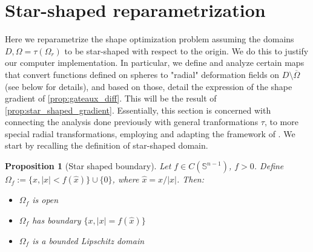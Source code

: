\documentclass[english,a4paper,9pt,oneside]{scrbook}	%
\theoremstyle{break}
\newtheorem{prop}[equation]{Proposition}
\theoremstyle{remark}
\newtheorem{obs}[equation]{Observation}
\newcommand{\mS}{\mathbb{S}^{n-1}}
\newcommand{\xh}{\hat{x}}
\begin{document}

\section{Star-shaped reparametrization}
\label{sec:star}

Here we reparametrize the shape optimization problem assuming the domains $D, \Omega=\tau(\Omega_r)$ to be star-shaped with respect to the origin. We do this to justify our computer implementation. In particular, we define and analyze certain maps that convert functions defined on spheres to "radial" deformation fields on $D\setminus \overline{\Omega}$ (see below for details), and based on those, detail the expression of the shape gradient of \cref{prop:gateaux_diff}. This will be the result of \cref{prop:star_shaped_gradient}. Essentially, this section is concerned with connecting the analysis done previously with general tranformations $\tau$, to more special radial transformations, employing and adapting the framework of \cite{deckelnick}. We start by recalling the definition of star-shaped domain.

\begin{prop}[Star shaped boundary]
Let $f \in C(\mS)$, $f>0$. Define $\Omega_f:=\{x, |x|<f(\xh)\}\cup\{0\}$, where $\xh=x/|x|$. Then:
\begin{itemize}
\item $\Omega_f$ is open
\item $\Omega_f$ has boundary $\{x, |x|=f(\xh)\}$
\item $\Omega_f$ is a bounded Lipschitz domain
\end{itemize}
\end{prop}
%
\end{document}
